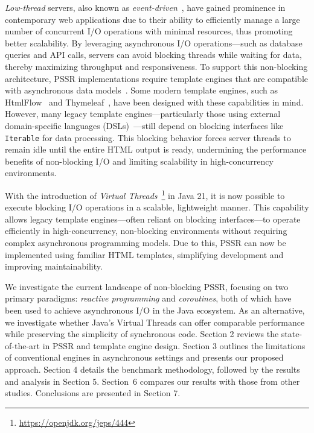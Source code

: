 \textit{Low-thread} servers, also known as
\textit{event-driven}~\cite{event-driven-servers}, have gained prominence in
contemporary web applications due to their ability to efficiently manage a large
number of concurrent I/O operations with minimal resources, thus promoting
better scalability.
By leveraging asynchronous I/O operations—such as
database queries and API calls, servers can avoid blocking threads while
waiting for data, thereby maximizing throughput and responsiveness. To support
this non-blocking architecture, PSSR implementations require template engines
that are compatible with asynchronous data models~\cite{carvalho2023async}.
Some modern template engines, such as HtmlFlow~\cite{htmlflow} and Thymeleaf~\cite{thymeleaf}, have
been designed with these capabilities in mind. However, many legacy
template engines—particularly those using external domain-specific languages
(DSLs)~\cite{Fowler03}—still depend on blocking interfaces like
\texttt{Iterable} for data processing. This blocking behavior forces server
threads to remain idle until the entire HTML output is ready, undermining the
performance benefits of non-blocking I/O and limiting scalability in
high-concurrency environments.

With the introduction of \textit{Virtual
    Threads}~\footnote{\url{https://openjdk.org/jeps/444}} in Java 21, it is now
possible to execute blocking I/O operations in a scalable, lightweight manner.
This capability allows legacy template engines—often reliant on blocking
interfaces—to operate efficiently in high-concurrency, non-blocking
environments without requiring complex asynchronous programming models. Due to this, PSSR can now be implemented using familiar HTML templates, simplifying
development and improving maintainability.

We investigate the current landscape of non-blocking PSSR, focusing on two
primary paradigms: \textit{reactive programming} and \textit{coroutines}, both
of which have been used to achieve asynchronous I/O in the Java ecosystem. As
an alternative, we investigate whether Java’s Virtual Threads can offer
comparable performance while preserving the simplicity of synchronous code.
Section 2 reviews the state-of-the-art in PSSR and template engine design.
Section 3 outlines the limitations of conventional engines in asynchronous
settings and presents our proposed approach. Section 4 details the benchmark
methodology, followed by the results and analysis in Section 5.
Section~6 compares our results with those from other studies.
Conclusions are presented in Section 7.